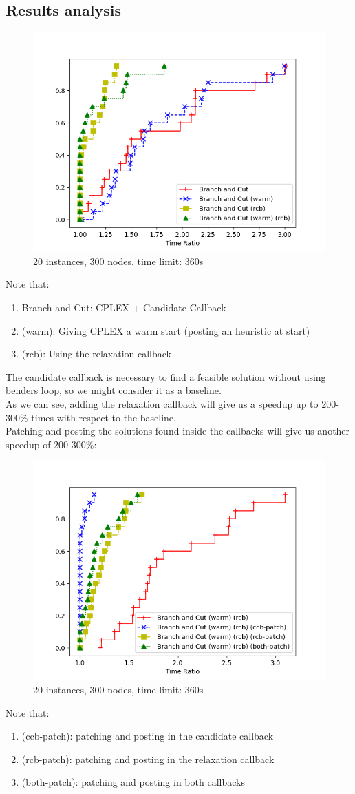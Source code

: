 \subsection{Results analysis}
\FloatBarrier
\begin{figure}[h]
    \centering
    \includegraphics*[width=.6\textwidth]{../plots/perfprof_bnc_times.png}
    \caption*{20 instances, 300 nodes, time limit: 360s}
\end{figure}
\FloatBarrier
Note that:
\begin{enumerate}
    \item[] Branch and Cut: CPLEX + Candidate Callback
    \item[] (warm): Giving CPLEX a warm start (posting an heuristic at start)
    \item[] (rcb): Using the relaxation callback
\end{enumerate}
The candidate callback is necessary to find a feasible solution without using benders loop, so we might consider it as a baseline.\\
As we can see, adding the relaxation callback will give us a speedup up to 200-300\% times with respect to the baseline.\\
Patching and posting the solutions found inside the callbacks will give us another speedup of 200-300\%:
\FloatBarrier
\begin{figure}[h]
    \centering
    \includegraphics*[width=.6\textwidth]{../plots/perfprof_bnc_patch_times.png}
    \caption*{20 instances, 300 nodes, time limit: 360s}
\end{figure}
\FloatBarrier
Note that:
\begin{enumerate}
    \item (ccb-patch): patching and posting in the candidate callback
    \item (rcb-patch): patching and posting in the relaxation callback
    \item (both-patch): patching and posting in both callbacks
\end{enumerate}

